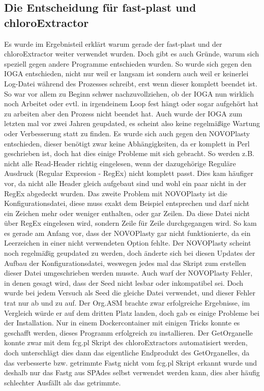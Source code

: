 \documentclass{scrartcl}
\begin{document}
\subsection{Die Entscheidung für fast-plast und chloroExtractor}
\label{sec-5-2}
Es wurde im Ergebnisteil erklärt warum gerade der fast-plast und der chloroExtractor weiter verwendet wurden. Doch gibt es auch Gründe, warum sich speziell gegen andere Programme entschieden wurden. 
So wurde sich gegen den IOGA entschieden, nicht nur weil er langsam ist sondern auch weil er keinerlei Log-Datei während des Prozesses schreibt, erst wenn dieser komplett beendet ist. So war vor allem zu Beginn 
 schwer nachzuvollziehen, ob der IOGA nun wirklich noch Arbeitet oder evtl. in irgendeinem Loop fest hängt oder sogar aufgehört hat zu arbeiten aber den Prozess nicht beendet hat. Auch wurde der IOGA zum letzten mal 
vor zwei Jahren geupdated, es scheint also keine regelmäßige Wartung oder Verbesserung statt zu finden. Es wurde sich auch gegen den NOVOPlasty entschieden, dieser benötigt zwar keine Abhängigkeiten, da er komplett 
in Perl geschrieben ist, doch hat dies einige Probleme mit sich gebracht. So werden z.B. nicht alle Read-Header richtig eingelesen, wenn der dazugehörige Reguläre Ausdruck (Regular Expresion - RegEx) nicht komplett passt. Dies kam häufiger 
vor, da nicht alle Header gleich aufgebaut sind und wohl ein paar nicht in der RegEx abgedeckt wurden. Das zweite Problem mit NOVOPlasty ist die Konfigurationsdatei, diese muss exakt dem Beispiel entsprechen und darf nicht ein Zeichen mehr
oder weniger enthalten, oder gar Zeilen. Da diese Datei nicht über RegEx eingelesen wird, sondern Zeile für Zeile durchgegangen wird. So kam es gerade am Anfang vor, dass der NOVOPlasty gar nicht funktionierte, da ein Leerzeichen 
in einer nicht verwendeten Option fehlte. Der NOVOPlasty scheint noch regelmäßig geupdated zu werden, doch änderte sich bei diesen Updates der Aufbau der Konfigurationsdatei, weswegen jedes mal das Skript zum erstellen dieser
Datei umgeschrieben werden musste. Auch warf der NOVOPlasty Fehler, in denen gesagt wird, dass der Seed nicht lesbar oder inkompatibel sei. Doch wurde bei jedem Versuch als Seed die gleiche Datei verwendet, und dieser Fehler trat nur ab und zu auf.
Der Org.ASM brachte zwar erfolgreiche Ergebnisse, im Vergleich würde er auf dem dritten Platz landen, doch gab es einige Probleme bei der Installation. Nur in einem
Dockercontainer mit einigen Tricks konnte es geschafft werden, dieses Programm erfolgreich zu installieren. Der GetOrganelle konnte zwar mit dem fcg.pl Skript des chloroExtractors automatisiert werden, doch unterschlägt
dies dann das eigentliche Endprodukt des GetOrganelles, da das verbesserte bzw. getrimmte Fastg nicht vom fcg.pl Skript erkannt wurde und deshalb nur das Fastg aus SPAdes selbst verwendet werden kann, dies aber häufig schlechter
Ausfällt als das getrimmte. 
\end{document}
